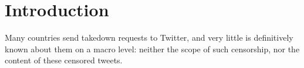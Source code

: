 \section{Introduction}\label{sec:intro}
Many countries send takedown requests to Twitter, and very little is definitively known 
about them on a macro level: neither the scope of such censorship, nor the content of these censored tweets.

